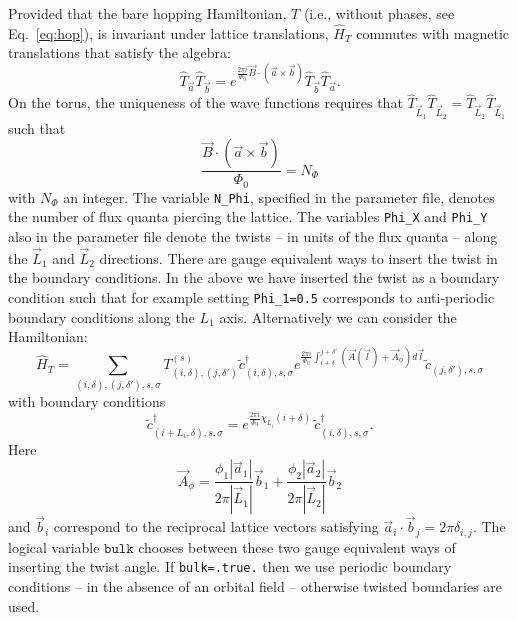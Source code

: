 Provided that the bare hopping Hamiltonian, $T$ (i.e., without phases, see Eq.~\eqref{eq:hop}), is invariant under lattice translations, $\hat{H}_T$ commutes with magnetic translations that satisfy the algebra:
\begin{equation}
\hat{T}_{\vec{a}} \hat{T}_{\vec{b}} =  e^{ \frac{2 \pi i}{\Phi_0}   \vec{B} \cdot \left( \vec{a} \times \vec{b} \right) }  \hat{T}_{\vec{b}} \hat{T}_{\vec{a}}. 
\end{equation}
On the  torus, the uniqueness of the wave functions requires that  $\hat{T}_{\vec{L}_1} \hat{T}_{\vec{L}_2}  =   \hat{T}_{\vec{L}_2} \hat{T}_{\vec{L}_1} $ such
that
\begin{equation}
\frac{\vec{B} \cdot \left( \vec{a} \times \vec{b}  \right) }{\Phi_0 } = N_{\Phi}   
\end{equation}
with  $N_\Phi $ an integer.  The variable \texttt{N\_Phi},   specified in the parameter file,   denotes the number of flux quanta piercing the lattice.    The variables \texttt{Phi\_X}  and   \texttt{Phi\_Y} also   in the parameter file denote  the twists  -- in units of the flux quanta  --  along the $\vec{L}_1$ and  $\vec{L}_2$ directions.     There are gauge  equivalent ways to insert the  twist in the boundary conditions. In the above we  have inserted the twist as a boundary condition such that for example setting \texttt{Phi\_1=0.5}  corresponds to anti-periodic boundary conditions along the $L_1$  axis.
Alternatively we can consider the Hamiltonian:
\begin{equation}
\hat{H}_T = \sum_{(i,\delta), (j,\delta'), s, \sigma}    T_{(i,\delta), (j,\delta')}^{(s)}    \tilde{c}^{\dagger}_{(i,\delta),s,\sigma }   e^{\frac{2 \pi i}{\Phi_0} \int_{i + \delta}^{j + \delta'} \left(  \vec{A}(\vec{l})  + \vec{A}_{\phi} \right)  d \vec{l}} \tilde{c}^{}_{(j,\delta'),s,\sigma }
\end{equation}
with boundary conditions 
\begin{equation}
\tilde{c}^{\dagger}_{(i + L_i,\delta) ,s,\sigma }   =  e^{\frac{2 \pi i }{\Phi_0} \chi_{L_i} ( i + \delta ) } \, \tilde{c}^{\dagger}_{(i,\delta) ,s,\sigma }.
\end{equation}
Here 
\begin{equation}
\vec{A}_{\phi} =\frac{  \phi_1  |\vec{a}_1|} { 2 \pi |\vec{L}_1| } \vec{b}_1 +  \frac{  \phi_2  |\vec{a}_2|}{2 \pi  |\vec{L}_2| } \vec{b}_2
\end{equation}
and $\vec{b}_i$  correspond to the reciprocal lattice vectors satisfying  $ \vec{a}_i  \cdot  \vec{b}_j  = 2 \pi \delta_{i,j} $.   The logical variable $\texttt{bulk} $ chooses between these two  gauge equivalent ways  of inserting the twist angle. If \texttt{bulk=.true.} then  we use periodic boundary conditions  --  in the absence of an orbital field -- otherwise  twisted boundaries are used.  

